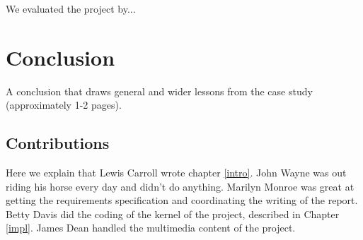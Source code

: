 \documentclass{l3proj}
\begin{document}
We evaluated the project by...

\chapter{Conclusion}

A conclusion that draws general and wider lessons from the case study (approximately 1-2 pages).

\section{Contributions}

Here we explain that Lewis Carroll wrote chapter \ref{intro}. John Wayne
was out riding his horse every day and didn't do anything. Marilyn Monroe
was great at getting the requirements specification and coordinating the
writing of the report. Betty Davis did the coding of the kernel of the
project, described in Chapter \ref{impl}.  James Dean handled the
multimedia content of the project.



\end{document}

